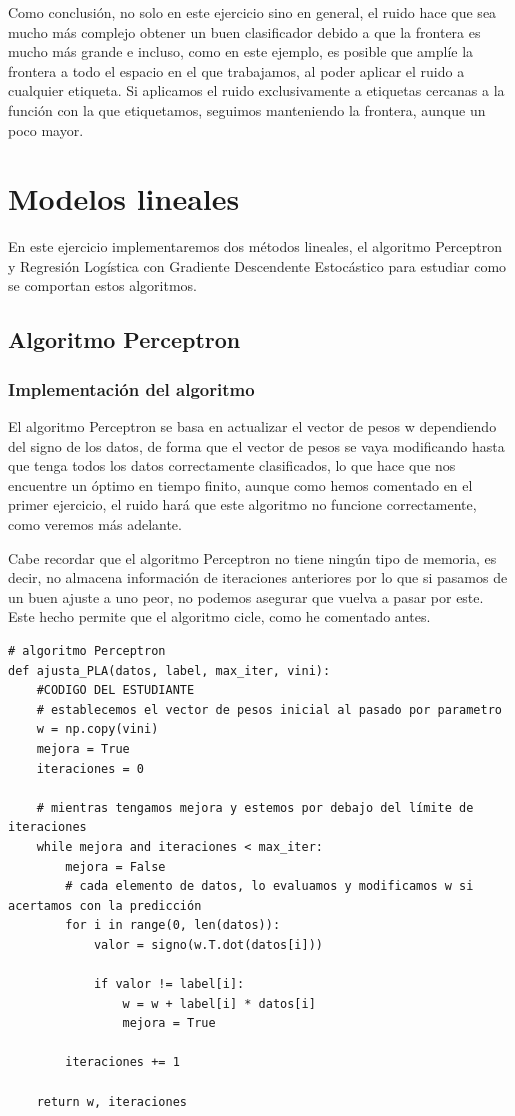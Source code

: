 \documentclass[12pt, spanish]{article}
\begin{document}
Como conclusión, no solo en este ejercicio sino en general, el ruido hace que sea mucho más complejo obtener un buen clasificador debido a que la frontera es mucho más grande e incluso, como en este ejemplo, es posible que amplíe la frontera a todo el espacio en el que trabajamos, al poder aplicar el ruido a cualquier etiqueta. Si aplicamos el ruido exclusivamente a etiquetas cercanas a la función con la que etiquetamos, seguimos manteniendo la frontera, aunque un poco mayor.

\newpage

\section{Modelos lineales}

En este ejercicio implementaremos dos métodos lineales, el algoritmo Perceptron y Regresión Logística con Gradiente Descendente Estocástico para estudiar como se comportan estos algoritmos.

\subsection{Algoritmo Perceptron}

\subsubsection{Implementación del algoritmo}

El algoritmo Perceptron se basa en actualizar el vector de pesos w dependiendo del signo de los datos, de forma que el vector de pesos se vaya modificando hasta que tenga todos los datos correctamente clasificados, lo que hace que nos encuentre un óptimo en tiempo finito, aunque como hemos comentado en el primer ejercicio, el ruido hará que este algoritmo no funcione correctamente, como veremos más adelante.

Cabe recordar que el algoritmo Perceptron no tiene ningún tipo de memoria, es decir, no almacena información de iteraciones anteriores por lo que si pasamos de un buen ajuste a uno peor, no podemos asegurar que vuelva a pasar por este. Este hecho permite que el algoritmo cicle, como he comentado antes.

\begin{lstlisting}
# algoritmo Perceptron
def ajusta_PLA(datos, label, max_iter, vini):
    #CODIGO DEL ESTUDIANTE
    # establecemos el vector de pesos inicial al pasado por parametro
	w = np.copy(vini)
	mejora = True
	iteraciones = 0

	# mientras tengamos mejora y estemos por debajo del límite de iteraciones
	while mejora and iteraciones < max_iter:
		mejora = False
		# cada elemento de datos, lo evaluamos y modificamos w si acertamos con la predicción
		for i in range(0, len(datos)):
			valor = signo(w.T.dot(datos[i]))

			if valor != label[i]:
				w = w + label[i] * datos[i]
				mejora = True

		iteraciones += 1

	return w, iteraciones

\end{lstlisting}
\end{document}
